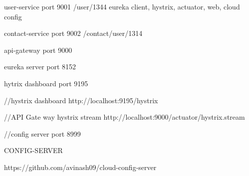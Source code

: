 user-service
			port 9001
			/user/1344
 eureka client, hystrix, actuator, web, cloud config
			
 contact-service
            port 9002
			/contact/user/1314
			
 api-gateway 
          port 9000
		  
 eureka server
          port 8152

 hytrix dashboard
          port 9195
		  
 //hystrix dashboard 		  
 http://localhost:9195/hystrix
 
 
 //API Gate way hystrix stream
 http://localhost:9000/actuator/hystrix.stream
 
 
 //config server
 port 8999
 
 CONFIG-SERVER
 
 https://github.com/avinash09/cloud-config-server